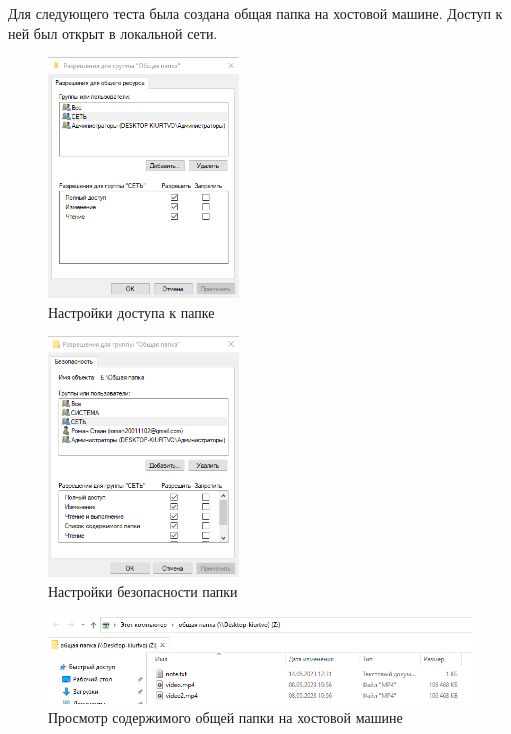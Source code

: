 \documentclass[bachelor, och, coursework]{SCWorks}
\begin{document}
Для следующего теста была создана общая папка на хостовой машине. Доступ к ней был открыт в локальной сети. 
\begin{figure}[H]
    \centering
    \includegraphics[width=0.45\textwidth]{Screenshot_2.png}
    \caption{Настройки доступа к папке}
\end{figure}

\begin{figure}[H]
    \centering
    \includegraphics[width=0.45\textwidth]{Screenshot_3.png}
    \caption{Настройки безопасности папки}
\end{figure}

\begin{figure}[H]
    \centering
    \includegraphics[width=1\textwidth]{papka2.png}
    \caption{Просмотр содержимого общей папки на хостовой машине}
\end{figure}
\end{document}
